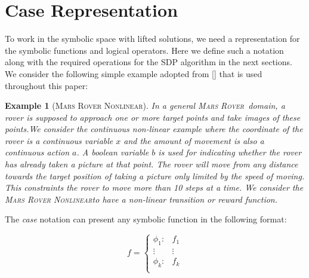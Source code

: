 \documentclass[letterpaper]{article}
\newcommand{\MarsRover}{\textsc{Mars Rover}}
\newcommand{\MarsRoverNL}{\textsc{Mars Rover Nonlinear}}
\newtheorem*{example*}{Example}
\begin{document}
\section{Case Representation}

To work in the symbolic space with lifted solutions, we need a representation for the symbolic functions and logical operators. Here we define such a notation along with the required operations for the SDP algorithm in the next sections. We consider the following simple example adopted from [] that is used throughout this paper:

\begin{example*}
[\MarsRoverNL] In a general \MarsRover\ domain, a rover is supposed to approach one or more target points and take images of these points.We consider the continuous non-linear example where the coordinate of the rover is a continuous variable $x$ and the amount of movement is also a continuous action $a$. A boolean variable $b$ is used for indicating whether the rover has already taken a picture at that point. The rover will move from any distance towards the target position of taking a picture only limited by the speed of moving. This constraints the rover to move more than 10 steps at a time. We consider the \MarsRoverNL  to have a non-linear transition or reward function.

\end{example*}

The \textit{case} notation can present any symbolic function in the following format: 

\begin{equation}
f = 
\begin{cases}
  \phi_1: & f_1 \\ 
 \vdots&\vdots\\ 
  \phi_k: & f_k \\ 
\end{cases}
\end{equation}
\end{document}
